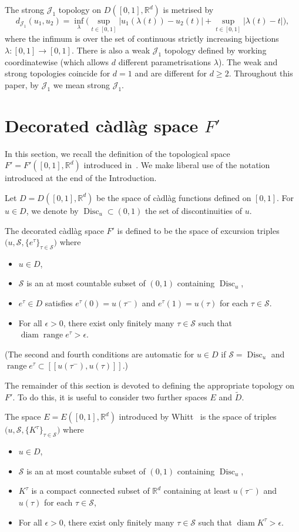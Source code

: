 \documentclass[12pt]{article}
\numberwithin{equation}{section}
\newcommand{\R}{{\mathbb R}}
\newcommand{\cJ}{{\mathcal J}}
\newcommand{\cS}{{\mathcal S}}
\newcommand{\tD}{{\widetilde D}}
\newcommand{\disc}{\operatorname{Disc}}
\newcommand{\diam}{\operatorname{diam}}
\newcommand{\range}{\operatorname{range}}
\begin{document}
\begin{rmk} The strong $\cJ_1$ topology on $D([0,1],\R^d)$ is metrised 
by 
\[
d_{\cJ_1}(u_1,u_2)=\inf_\lambda \Big(\sup_{t\in[0,1]}|u_1(\lambda(t))-u_2(t)|+\sup_{t\in[0,1]}|\lambda(t)-t|\Big),
\]
where the infimum is over the set of continuous strictly increasing bijections $\lambda:[0,1]\to [0,1]$.
There is also a weak $\cJ_1$ topology defined by working coordinatewise (which allows $d$ different parametrisations $\lambda$). The weak and strong topologies coincide for $d=1$ and are different for $d\ge2$.
Throughout this paper, by $\cJ_1$ we mean strong $\cJ_1$.

\end{rmk}


\section{Decorated c\`adl\`ag space $F'$}
\label{sec:F'}

In this section, we recall the definition of the topological space 
$F'=F'([0,1],\R^d)$ introduced in~\cite{Freitas2Toddsub}. We make liberal use of the notation introduced at the end of the Introduction.

Let $D=D([0, 1], \R^d)$ be the space of c\`adl\`ag functions defined on 
$[0,1]$.  For $u\in D$, we denote by $\disc_u\subset(0,1)$ the set of 
discontinuities of $u$. 

The decorated c\`adl\`ag space $F'$ is defined to be the space of excursion triples $\big(u, \cS, \{e^\tau\}_{\tau\in \cS}\big)$
where 
\begin{itemize}
\item $u\in D$, 
\item $\cS$ is an at most countable subset of $(0,1)$ containing $\disc_u$,
\item $e^\tau\in D$ satisfies
$e^\tau(0)=u(\tau^-)$ and $e^\tau(1)=u(\tau)$ for each
$\tau\in \cS$. 
\item 
For all $\epsilon >0$, there exist only finitely many $\tau\in \cS$ such that $\diam\range e^\tau>\epsilon$.
\end{itemize}
(The second and fourth conditions are automatic for $u\in D$ if $\cS=\disc_u$
and $\range e^\tau\subset [[u(\tau^-),u(\tau)]]$.)

The remainder of this section is devoted to defining the appropriate topology on~$F'$.
To do this, it is useful to consider two further spaces $E$ and $\tD$.

The space $E=E([0, 1], \R^d)$ introduced by Whitt~\cite[Sections~15.4 and 15.5]{Whitt} is the space of triples
$
\big(u,\cS,\{K^\tau\}_{\tau\in \cS}\big)
$
where 
\begin{itemize}
\item $u\in D$, 
\item $\cS$ is an at most countable subset of $(0,1)$ containing $\disc_u$, 
\item 
$K^\tau$ is a compact connected subset of $\R^d$ containing at least $u(\tau^-)$ and $u(\tau)$
for each $\tau\in \cS$,  
\item 
 For all $\epsilon >0$, there exist only finitely many $\tau\in \cS$ such that $\diam K^\tau>\epsilon$. 
\end{itemize}
\end{document}
